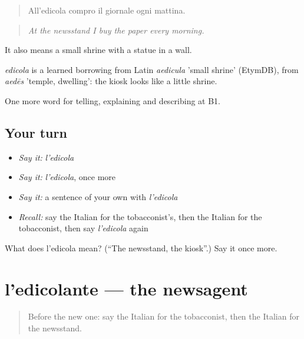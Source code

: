 \begin{quote}
All'edicola compro il giornale ogni mattina.
\end{quote}

\begin{quote}
\emph{At the newsstand I buy the paper every morning.}
\end{quote}

It also means a small shrine with a statue in a wall.

\begin{cousinweb}
\emph{edicola} is a learned borrowing from Latin \emph{aedicula} 'small shrine' (EtymDB), from \emph{aedēs} 'temple, dwelling': the kiosk looks like a little shrine.
\end{cousinweb}

\begin{grammarlens}[title={What you've built}]
One more word for telling, explaining and describing at B1.
\end{grammarlens}

\subsection*{Your turn}
\begin{itemize}
\raggedright
  \item \emph{Say it:} \emph{l'edicola}
  \item \emph{Say it:} \emph{l'edicola}, once more
  \item \emph{Say it:} a sentence of your own with \emph{l'edicola}
  \item \emph{Recall:} say the Italian for the tobacconist's, then the Italian for the tobacconist, then say \emph{l'edicola} again
\end{itemize}

\begin{tcolorbox}[breakable,colback=teal!4,colframe=teal!35!black,title={Before you move on}]
What does l'edicola mean? (\textquotedblleft{}The newsstand, the kiosk\textquotedblright{}.) Say it once more.
\end{tcolorbox}
\section[l'edicolante]{l'edicolante — the newsagent}

\label{lesson:IT-C452-edicolante}



\begin{quote}
Before the new one: say the Italian for the tobacconist, then the Italian for the newsstand.
\end{quote}


